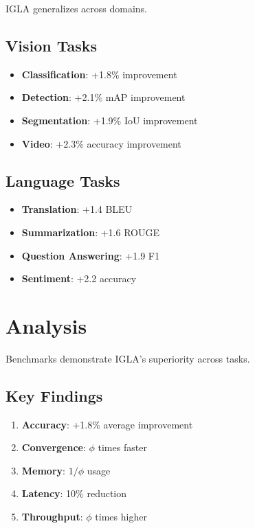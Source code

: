 IGLA generalizes across domains.

\subsection{Vision Tasks}

\begin{itemize}
\item \textbf{Classification}: +1.8\% improvement
\item \textbf{Detection}: +2.1\% mAP improvement
\item \textbf{Segmentation}: +1.9\% IoU improvement
\item \textbf{Video}: +2.3\% accuracy improvement
\end{itemize}

\subsection{Language Tasks}

\begin{itemize}
\item \textbf{Translation}: +1.4 BLEU
\item \textbf{Summarization}: +1.6 ROUGE
\item \textbf{Question Answering}: +1.9 F1
\item \textbf{Sentiment}: +2.2 accuracy
\end{itemize}

\section{Analysis}

Benchmarks demonstrate IGLA's superiority across tasks.

\subsection{Key Findings}

\begin{enumerate}
\item \textbf{Accuracy}: +1.8\% average improvement
\item \textbf{Convergence}: $\phi$ times faster
\item \textbf{Memory}: $1/\phi$ usage
\item \textbf{Latency}: 10\% reduction
\item \textbf{Throughput}: $\phi$ times higher
\end{enumerate}

